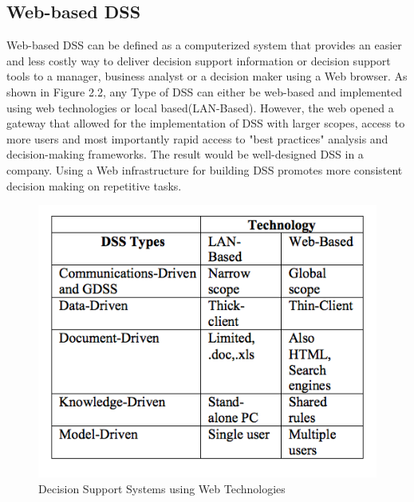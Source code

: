 \subsection{Web-based DSS}
\indent Web-based DSS can be defined as a computerized system that provides an easier and less costly way to deliver decision support information or decision support tools to a manager, business analyst or a decision maker using a Web browser. As shown in Figure 2.2, any Type of DSS can either be web-based and implemented using web technologies or local based(LAN-Based). However, the web  opened a gateway that allowed for the implementation of DSS with larger scopes, access to more users and most importantly rapid access to "best practices" analysis and decision-making frameworks. The result would be well-designed DSS in a company. Using a Web infrastructure for building DSS promotes more consistent decision making on repetitive tasks\cite{power2000web}.
\begin{figure}[H]
\centering
\includegraphics[scale=0.5]{Images/Web-based.png}
\caption[Decision Support Systems using Web Technologies]{Decision Support Systems using Web Technologies \cite{power2000web}}
\end{figure}

